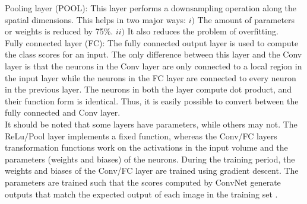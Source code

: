 Pooling layer (POOL): This layer performs a downsampling operation along the spatial dimensions. This helps in two major ways: $i)$ The amount of parameters or weights is reduced by 75\%. $ii)$ It also reduces the problem of overfitting.\\
Fully connected layer (FC): The fully connected output layer is used to compute the class scores for an input. The only difference between this layer and the Conv layer is that the neurons in the Conv layer are only connected to a local region in the input layer while the neurons in the FC layer are connected to every neuron in the previous layer. The neurons in both the layer compute dot product, and their function form is identical. Thus, it is easily possible to convert between the fully connected and Conv layer.\\

It should be noted that some layers have parameters, while others may not. The ReLu/Pool layer implements a fixed function, whereas the Conv/FC layers transformation functions work on the activations in the input volume and the parameters (weights and biases) of the neurons. During the training period, the weights and biases of the Conv/FC layer are trained using gradient descent. The parameters are trained such that the scores computed by ConvNet generate outputs that match the expected output of each image in the training set \cite{convNNStan}.

